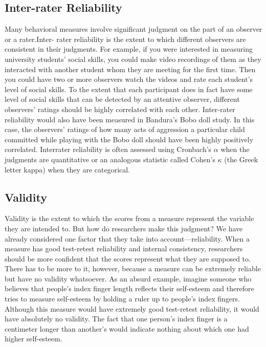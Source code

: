 \subsection{Inter-rater Reliability}

Many behavioral measures involve significant judgment on the part of an observer or a rater.Inter- rater reliability is the extent to which different observers are consistent in their judgments. For example, if you were interested in measuring university students' social skills, you could make video recordings of them as they interacted with another student whom they are meeting for the first time. Then you could have two or more observers watch the videos and rate each student's level of social skills. To the extent that each participant does in fact have some level of social skills that can be detected by an attentive observer, different observers' ratings should be highly correlated with each other. Inter-rater reliability would also have been measured in Bandura's Bobo doll study. In this case, the observers' ratings of how many acts of aggression a particular child committed while playing with the Bobo doll should have been highly positively correlated. Interrater reliability is often assessed using Cronbach's $\alpha$ when the judgments are quantitative or an analogous statistic called Cohen's $\kappa$ (the Greek letter kappa) when they are categorical.

\subsection{Validity}

Validity is the extent to which the scores from a measure represent the variable they are intended to. But how do researchers make this judgment? We have already considered one factor that they take into account—reliability. When a measure has good test-retest reliability and internal consistency, researchers should be more confident that the scores represent what they are supposed to. There has to be more to it, however, because a measure can be extremely reliable but have no validity whatsoever. As an absurd example, imagine someone who believes that people's index finger length reflects their self-esteem and therefore tries to measure self-esteem by holding a ruler up to people's index fingers. Although this measure would have extremely good test-retest reliability, it would have absolutely no validity. The fact that one person's index finger is a centimeter longer than another's would indicate nothing about which one had higher self-esteem.

